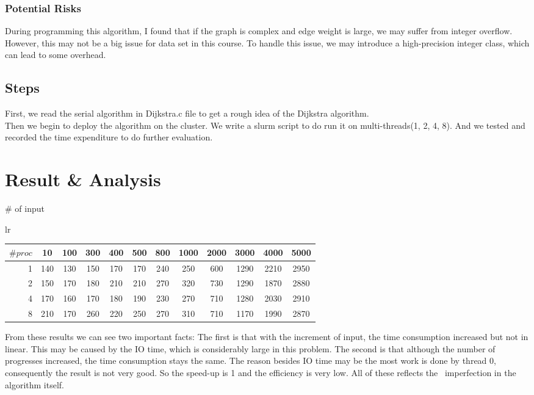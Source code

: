 \documentclass{article}
\begin{document}
\subsubsection{Potential Risks}
During programming this algorithm, I found that if the graph is complex and edge weight is large, we may suffer from integer overflow. However, this may not be a big issue for data set in this course. To handle this issue, we may introduce a high-precision integer class, which can lead to some overhead.



\subsection{Steps}
First, we read the serial algorithm in Dijkstra.c file to get a rough idea of the Dijkstra algorithm.\\
Then we begin to deploy the algorithm on the cluster. We write a slurm script to do run it on multi-threads(1, 2, 4, 8). And we tested and recorded the time expenditure to do further evaluation.
\section{Result \& Analysis}
\begin{center}
	\# of input
\begin{tabular}{lr}
  \begin{tabular}[t]{r|ccccccccccc}
$\# proc$&10&100&300&400&500&800&1000&2000&3000&4000&5000\\
\hline
1&140&130&150&170&170&240&250&600&1290&2210&2950\\
2&150&170&180&210&210&270&320&730&1290&1870&2880\\
4&170&160&170&180&190&230&270&710&1280&2030&2910\\
8&210&170&260&220&250&270&310&710&1170&1990&2870\\
  \end{tabular}
 \end{tabular}
\end{center}
From these results we can see two important facts: The first is that with the increment of input, the time consumption increased but not in linear. This may be caused by the IO time, which is considerably large in this problem. The second is that although the number of progresses increased, the time consumption stays the same. The reason besides IO time may be the most work is done by thread 0, consequently the result is not very good. So the speed-up is 1 and the efficiency is very low. All of these reflects the  imperfection in the algorithm itself.
\end{document}
